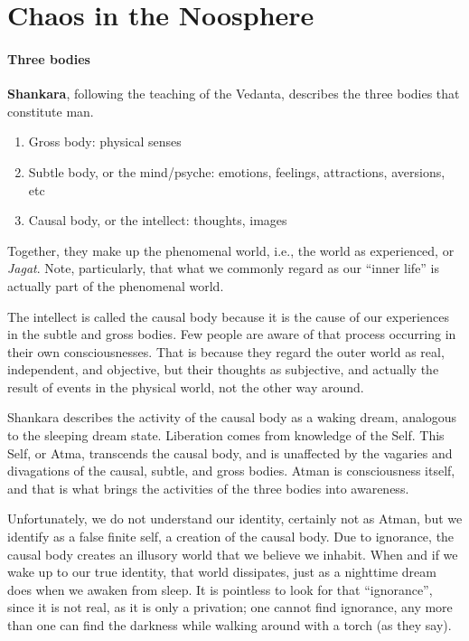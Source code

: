 \section{Chaos in the Noosphere}

\paragraph{Three bodies}


\textbf{Shankara}, following the teaching of the Vedanta, describes the three bodies that constitute man.

\begin{enumerate}


\item Gross body: physical senses

\item Subtle body, or the mind/psyche: emotions, feelings, attractions, aversions, etc

\item Causal body, or the intellect: thoughts, images
\end{enumerate}


Together, they make up the phenomenal world, i.e., the world as experienced, or \emph{Jagat}. Note, particularly, that what we commonly regard as our ``inner life'' is actually part of the phenomenal world.

The intellect is called the causal body because it is the cause of our experiences in the subtle and gross bodies. Few people are aware of that process occurring in their own consciousnesses. That is because they regard the outer world as real, independent, and objective, but their thoughts as subjective, and actually the result of events in the physical world, not the other way around.

Shankara describes the activity of the causal body as a waking dream, analogous to the sleeping dream state. Liberation comes from knowledge of the Self. This Self, or Atma, transcends the causal body, and is unaffected by the vagaries and divagations of the causal, subtle, and gross bodies. Atman is consciousness itself, and that is what brings the activities of the three bodies into awareness.

Unfortunately, we do not understand our identity, certainly not as Atman, but we identify as a false finite self, a creation of the causal body. Due to ignorance, the causal body creates an illusory world that we believe we inhabit. When and if we wake up to our true identity, that world dissipates, just as a nighttime dream does when we awaken from sleep. It is pointless to look for that ``ignorance'', since it is not real, as it is only a privation; one cannot find ignorance, any more than one can find the darkness while walking around with a torch (as they say).

